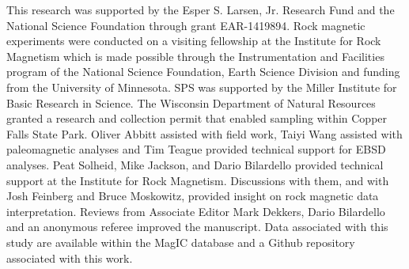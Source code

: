 \documentclass[draft]{agujournal2018}
\begin{document}
%
%
%
%
%
%
%
%


\acknowledgments
This research was supported by the Esper S. Larsen, Jr. Research Fund and the National Science Foundation through grant EAR-1419894. Rock magnetic experiments were conducted on a visiting fellowship at the Institute for Rock Magnetism which is made possible through the Instrumentation and Facilities program of the National Science Foundation, Earth Science Division and funding from the University of Minnesota. SPS was supported by the Miller Institute for Basic Research in Science. The Wisconsin Department of Natural Resources granted a research and collection permit that enabled sampling within Copper Falls State Park. Oliver Abbitt assisted with field work, Taiyi Wang assisted with paleomagnetic analyses and Tim Teague provided technical support for EBSD analyses. Peat Solheid, Mike Jackson, and Dario Bilardello provided technical support at the Institute for Rock Magnetism. Discussions with them, and with Josh Feinberg and Bruce Moskowitz, provided insight on rock magnetic data interpretation. Reviews from Associate Editor Mark Dekkers, Dario Bilardello and an anonymous referee improved the manuscript. Data associated with this study are available within the MagIC database and a Github repository associated with this work.



%

%





\end{document}
